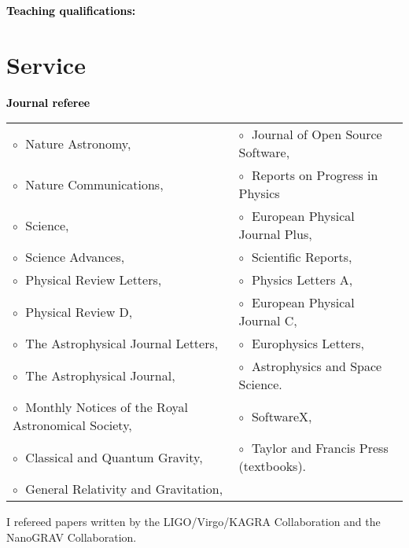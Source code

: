 \vspace{0.2cm}
\textbf{\textcolor{black}{Teaching qualifications:}}\vspace{0.05cm}\\




\section{Service}




\textbf{\textcolor{black}{Journal referee}}\vspace{0.1cm}\\
\begin{tabular}{@{\hskip 0.4cm}l@{\hskip 0.4in}l}
$\circ\;$ Nature Astronomy,  & $\circ\;$     Journal of Open Source Software, \\
$\circ\;$ Nature Communications,  & $\circ\;$  Reports on Progress in Physics   \\
$\circ\;$ Science, & $\circ\;$  European Physical Journal Plus,  \\
$\circ\;$ Science Advances, & $\circ\;$ Scientific Reports, \\
$\circ\;$ Physical Review Letters, & $\circ\;$ Physics Letters A, \\
$\circ\;$ Physical Review D,  & $\circ\;$ European Physical Journal C,  \\
$\circ\;$  The Astrophysical Journal Letters,  &  $\circ\;$  Europhysics Letters, \\
$\circ\;$ The Astrophysical Journal,  &  $\circ\;$ Astrophysics and Space Science. \\
$\circ\;$  Monthly Notices of the Royal Astronomical Society, & $\circ\;$ SoftwareX, \\
$\circ\;$  Classical and Quantum Gravity, & $\circ\;$ Taylor and Francis Press (textbooks). \\
$\circ\;$  General Relativity and Gravitation, & \\
\end{tabular}

\vspace{0.2cm}

I refereed papers written by the LIGO/Virgo/KAGRA Collaboration and the NanoGRAV Collaboration.


\vspace{0.2cm}



